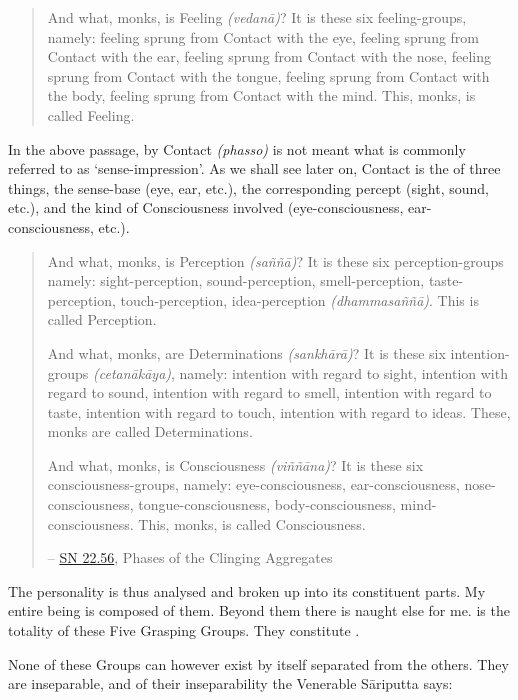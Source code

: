 \begin{quote}
And what, monks, is Feeling \emph{(vedanā)}? It is these six feeling-groups, namely: feeling sprung from Contact with the eye, feeling sprung from Contact with the ear, feeling sprung from Contact with the nose, feeling sprung from Contact with the tongue, feeling sprung from Contact with the body, feeling sprung from Contact with the mind. This, monks, is called Feeling.
\end{quote}

In the above passage, by Contact \emph{(phasso)} is not meant what is commonly referred to as `sense-impression'. As we shall see later on, Contact is the  of three things, the sense-base (eye, ear, etc.), the corresponding percept (sight, sound, etc.), and the kind of Consciousness involved (eye-consciousness, ear-consciousness, etc.).

\clearpage

\begin{quote}
And what, monks, is Perception \emph{(saññā)}? It is these six perception-groups namely: sight-perception, sound-perception, smell-perception, taste-perception, touch-perception, idea-perception \emph{(dhammasaññā)}. This is called Perception.

And what, monks, are Determinations \emph{(sankhārā)}? It is these six intention-groups \emph{(cetanākāya)}, namely: intention with regard to sight, intention with regard to sound, intention with regard to smell, intention with regard to taste, intention with regard to touch, intention with regard to ideas. These, monks are called Determinations.

And what, monks, is Consciousness \emph{(viññāna)}? It is these six consciousness-groups, namely: eye-consciousness, ear-consciousness, nose-consciousness, tongue-consciousness, body-consciousness, mind-consciousness. This, monks, is called Consciousness.

 -- \href{https://suttacentral.net/sn22.56/en/bodhi}{SN 22.56}, Phases of the Clinging Aggregates
\end{quote}

The personality is thus analysed and broken up into its constituent parts. My entire being is composed of them. Beyond them there is naught else for me.  is the totality of these Five Grasping Groups. They constitute .

None of these Groups can however exist by itself separated from the others. They are inseparable, and of their inseparability the Venerable Sāriputta says:

